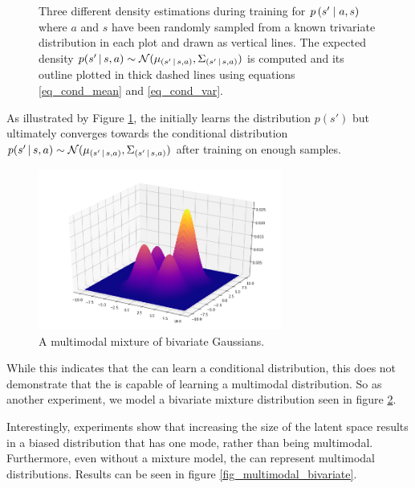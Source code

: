 \begin{figure}
\caption[]{Three different density estimations during training for \ensuremath{p \given*{s'}{a,s}} where $a$ and $s$ have been randomly sampled from a known trivariate distribution in each plot and drawn as vertical lines. The expected density $p \given{s'}{s, a} \sim \N (\mu_{\given{s'}{s,a}}, \Sigma_{\given{s'}{s,a}})$ is computed and its outline plotted in thick dashed lines using equations \ref{eq_cond_mean} and \ref{eq_cond_var}.}
\label{fig:trivariate_density}
\end{figure}

As illustrated by Figure \ref{fig:trivariate_density}, the \cvae{} initially learns the distribution $p(s')$ but ultimately converges towards the conditional distribution $p \given{s'}{s, a} \sim \N (\mu_{\given{s'}{s,a}}, \Sigma_{\given{s'}{s,a}})$ after training on enough samples. %

\iffalse
\begin{figure}
\begin{center}
\includegraphics[width=8cm]{img/multimodal_bivariate_3d.png}
\caption{A multimodal mixture of bivariate Gaussians.}
\label{fig_multimodal_bivariate_3d}
\end{center}
\end{figure}
While this indicates that the \cvae{} can learn a conditional distribution, this does not demonstrate that the \cvae{} is capable of learning a multimodal distribution. So as another experiment, we model a bivariate mixture distribution seen in figure \ref{fig_multimodal_bivariate_3d}.

Interestingly, experiments show that increasing the size of the latent space results in a biased distribution that has one mode, rather than being multimodal. Furthermore, even without a mixture model, the \cvae{} can represent multimodal distributions. Results can be seen in figure \ref{fig_multimodal_bivariate}.

